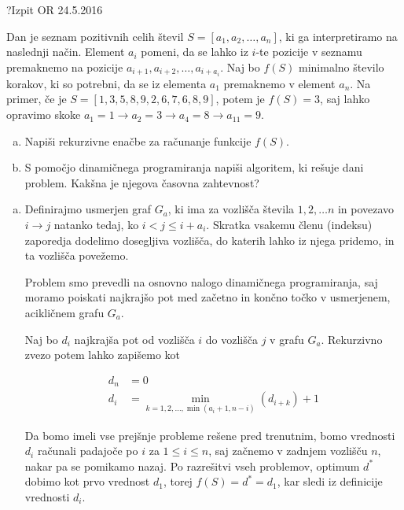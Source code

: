 \begin{naloga}{?}{Izpit OR 24.5.2016}
\begin{vprasanje}
Dan je seznam pozitivnih celih števil $S = [a_1, a_2, \dots, a_n]$,
ki ga interpretiramo na naslednji način.
Element $a_i$ pomeni,
da se lahko iz $i$-te pozicije v seznamu
premaknemo na pozicije $a_{i+1}, a_{i+2}, \dots, a_{i+a_i}$.
Naj bo $f(S)$ minimalno število korakov,
ki so potrebni, da se iz elementa $a_1$ premaknemo v element $a_n$.
Na primer, če je $S = [1, 3, 5, 8, 9, 2, 6, 7, 6, 8, 9]$,
potem je $f(S) = 3$,
saj lahko opravimo skoke $a_1 = 1 \to a_2 = 3 \to a_4 = 8 \to a_{11} = 9$.

\begin{enumerate}[(a)]
\item Napiši rekurzivne enačbe za računanje funkcije $f(S)$.

\item S pomočjo dinamičnega programiranja napiši algoritem,
ki rešuje dani problem.
Kakšna je njegova časovna zahtevnost?
\end{enumerate}
\end{vprasanje}
\begin{odgovor}

\begin{enumerate}[a)]

\item Definirajmo usmerjen graf $G_a$, ki ima za vozlišča števila $1, 2, \dots n$ in povezavo $i \rightarrow j$ natanko tedaj, ko $i < j \leq i + a_i$.
Skratka vsakemu členu (indeksu) zaporedja dodelimo dosegljiva vozlišča, do katerih lahko iz njega  pridemo, in ta vozlišča povežemo.

Problem smo prevedli na osnovno nalogo dinamičnega programiranja, saj moramo poiskati najkrajšo pot med začetno in končno točko v 
usmerjenem, acikličnem grafu $G_a$.

Naj bo $d_i$ najkrajša pot od vozlišča $i$ do vozlišča $j$ v grafu $G_a$. 
Rekurzivno zvezo potem lahko zapišemo kot

\begin{align*}
d_n &= 0 \\
d_i &= \min_{k = 1, 2, \dots, \min(a_i + 1, n - i)}(d_{i + k}) + 1
\end{align*}

Da bomo imeli vse prejšnje probleme rešene pred trenutnim, bomo vrednosti $d_i$ računali padajoče po $i$ za $1 \leq i \leq n$, 
saj začnemo v zadnjem vozlišču $n$, nakar pa se pomikamo nazaj.
Po razrešitvi vseh problemov, optimum $d^*$ dobimo kot prvo vrednost $d_1$, torej $f(S) = d^* = d_1$, kar sledi iz definicije vrednosti $d_i$.


\end{enumerate}
\end{odgovor}
\end{naloga}
